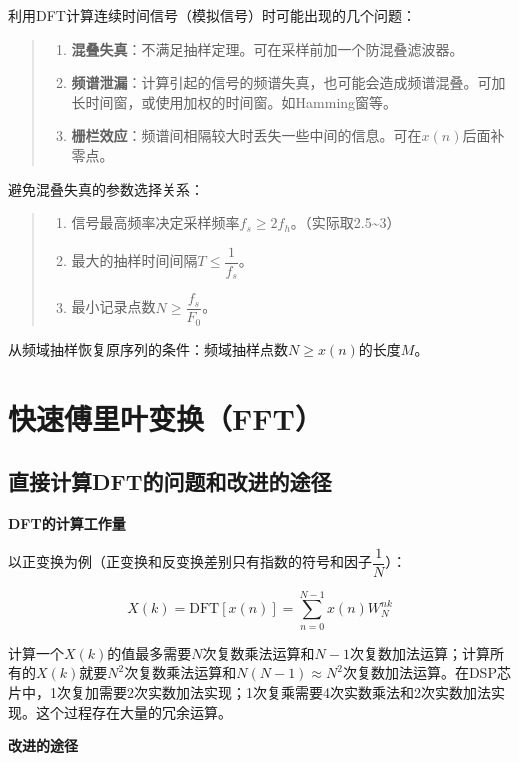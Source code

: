 \documentclass[cn, hazy, blue, normal, 14pt]{elegantnote}
\begin{document}
利用DFT计算连续时间信号（模拟信号）时可能出现的几个问题：

\begin{quote}
\begin{enumerate}
    \item \textbf{混叠失真}：不满足抽样定理。可在采样前加一个防混叠滤波器。
    \item \textbf{频谱泄漏}：计算引起的信号的频谱失真，也可能会造成频谱混叠。可加长时间窗，或使用加权的时间窗。如Hamming窗等。
    \item \textbf{栅栏效应}：频谱间相隔较大时丢失一些中间的信息。可在$x(n)$后面补零点。
\end{enumerate}
\end{quote}

避免混叠失真的参数选择关系：

\begin{quote}
\begin{enumerate}
    \item 信号最高频率决定采样频率$f_s\geq 2f_h$。（实际取2.5\textasciitilde 3）
    \item 最大的抽样时间间隔$T\leq \dfrac{1}{f_s}$。
    \item 最小记录点数$N\geq\dfrac{f_s}{F_0}$。
\end{enumerate}
\end{quote}

从频域抽样恢复原序列的条件：频域抽样点数$N\geq x(n)$的长度$M$。

\section{快速傅里叶变换（FFT）}

\subsection{直接计算DFT的问题和改进的途径}

\textbf{DFT的计算工作量}

以正变换为例（正变换和反变换差别只有指数的符号和因子$\dfrac{1}{N}$）：

$$X(k)=\text{DFT}[{x}(n)]=\sum_{n=0}^{N-1}{{x}(n)W_{N}^{nk}}$$

计算一个$X(k)$的值最多需要$N$次复数乘法运算和$N-1$次复数加法运算；计算所有的$X(k)$就要$N^2$次复数乘法运算和$N(N-1)\approx N^2$次复数加法运算。在DSP芯片中，1次复加需要2次实数加法实现；1次复乘需要4次实数乘法和2次实数加法实现。这个过程存在大量的冗余运算。

\textbf{改进的途径}
\end{document}
